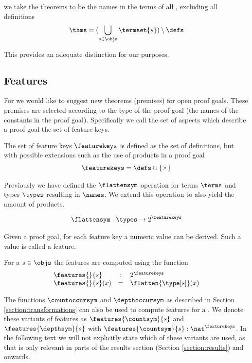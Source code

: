 \begin{definition}\label{def:thms}
  we take the theorems to be the names in the terms of all \coqobj, excluding all definitions
  \[ \thms = (\bigcup_{s \in \objs} \termset{s}) \setminus \defs \]
\end{definition}

This provides an adequate distinction for our purposes.

\subsection{Features}
\label{section:feats}

For \premiseselection we would like to suggest new theorems (premises) for open proof goals.
These premises are selected according to the type of the proof goal (the names of the constants in the proof goal).
Specifically we call the set of aspects which describe a proof goal the set of feature keys.

\begin{definition}\label{def:featurekeys}
  The set of feature keys $\featurekeys$ is defined as the set of definitions, but with possible extensions such as the use of products in a proof goal
  \[ \featurekeys = \defs \cup \{ \times \} \]
\end{definition}

Previously we have defined the $\flattensym$ operation for terms $\terms$ and types $\types$ resulting in $\names$.
We extend this operation to also yield the amount of products.

\[ \flattensym : \types \rightarrow 2^{\featurekeys} \]

Given a proof goal, for each feature key a numeric value can be derived.
Such a value is called a feature.

\begin{definition}\label{def:features}
  For a \coqobj $s \in \objs$ the features are computed using the function
  $$
  \begin{array}{lcl}
    \features{}{s} & : & 2^\featurekeys \\
    \features{}{s}(x) & = & \flatten{\type[s]}(x)
  \end{array}
  $$
\end{definition}

The functions $\countoccursym$ and $\depthoccursym$ as described in Section \ref{section:transformations} can also be used to compute features for a \coqobj.
We denote these variants of features as $\features{\countsym}{s}$ and $\features{\depthsym}{s}$ with $\features{\countsym}{s} : \nat^\featurekeys$.
In the following text we will not explicitly state which of these variants are used,
as that is only relevant in parts of the results section (Section \ref{section:results}) and onwards.

